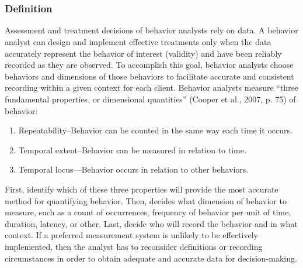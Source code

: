\chapter{\foursech{}}
%
\section[\fourhOne{}]{\fourhOne{}%
              }
\subsection{Definition}
Assessment and treatment decisions of behavior analysts rely on data. A behavior analyst can design and implement effective treatments only when the data accurately represent the behavior of interest (validity) and have been reliably recorded as they are observed. To accomplish this goal, behavior analysts choose behaviors and dimensions of those behaviors to facilitate accurate and consistent recording within a given context for each client. Behavior analysts measure ``three fundamental properties, or dimensional quantities'' (Cooper et al., 2007, p. 75) of behavior: 
\begin{enumerate}
\item Repeatability--Behavior can be counted in the same way each time it occurs.
\item Temporal extent--Behavior can be measured in relation to time.
\item Temporal locus—Behavior occurs in relation to other behaviors.
\end{enumerate}

First, identify which of these three properties will provide the most accurate method for quantifying behavior. Then, decides what dimension of behavior to measure, such as a count of occurrences, frequency of behavior per unit of time, duration, latency, or other. Last, decide who will record the behavior and in what context. If a preferred measurement system is unlikely to be effectively implemented, then the analyst has to reconsider definitions or recording circumstances in order to obtain adequate and accurate data for decision-making. 
%
